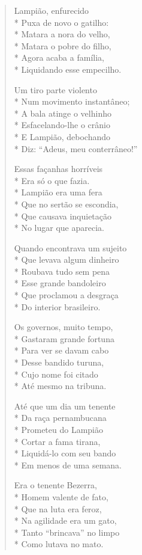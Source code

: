 \begin{verse}
Lampião, enfurecido\\*
Puxa de novo o gatilho:\\*
Matara a nora do velho,\\*
Matara o pobre do filho,\\*
Agora acaba a família,\\*
Liquidando esse empecilho.

Um tiro parte violento\\*
Num movimento instantâneo;\\*
A bala atinge o velhinho\\*
Esfacelando-lhe o crânio\\*
E Lampião, debochando\\*
Diz: “Adeus, meu conterrâneo!”

Essas façanhas horríveis\\*
Era só o que fazia.\\*
Lampião era uma fera\\*
Que no sertão se escondia,\\*
Que causava inquietação\\*
No lugar que aparecia.

Quando encontrava um sujeito\\*
Que levava algum dinheiro\\*
Roubava tudo sem pena\\*
Esse grande bandoleiro\\*
Que proclamou a desgraça\\*
Do interior brasileiro.

Os governos, muito tempo,\\*
Gastaram grande fortuna\\*
Para ver se davam cabo\\*
Desse bandido turuna,\\*
Cujo nome foi citado\\*
Até mesmo na tribuna.

Até que um dia um tenente\\*
Da raça pernambucana\\*
Prometeu do Lampião\\*
Cortar a fama tirana,\\*
Liquidá-lo com seu bando\\*
Em menos de uma semana.

Era o tenente Bezerra,\\*
Homem valente de fato,\\*
Que na luta era feroz,\\*
Na agilidade era um gato,\\*
Tanto “brincava” no limpo\\*
Como lutava no mato.


\end{verse}
